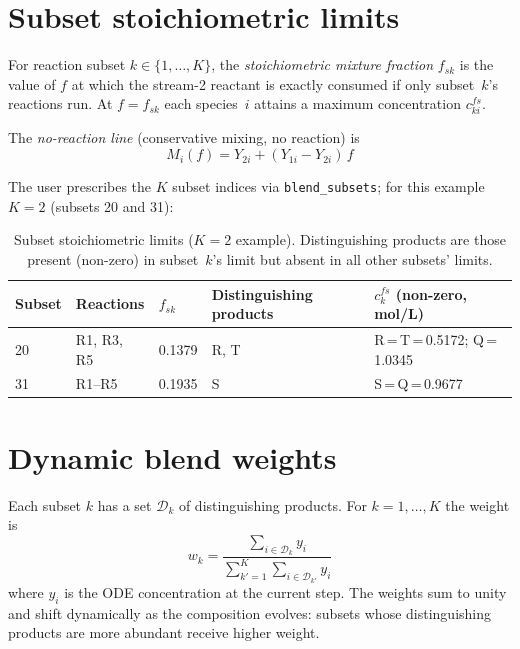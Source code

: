 \documentclass[11pt]{article}
\newcommand{\fsk}{f_{sk}}
\begin{document}
\section{Subset stoichiometric limits}

For reaction subset $k\in\{1,\ldots,K\}$, the \emph{stoichiometric mixture fraction}
$\fsk$ is the value of $f$ at which the stream-2 reactant is exactly consumed if only
subset~$k$'s reactions run.  At $f = \fsk$ each species~$i$ attains a maximum
concentration $c^{fs}_{ki}$.

The \emph{no-reaction line} (conservative mixing, no reaction) is
\begin{equation}
  M_i(f) = Y_{2i} + (Y_{1i} - Y_{2i})\,f
  \label{eq:no-reaction}
\end{equation}

The user prescribes the $K$ subset indices via \texttt{blend\_subsets}; for this example
$K=2$ (subsets 20 and 31):

\begin{table}[h]
\centering
\small
\begin{tabular}{lllll}
\toprule
Subset & Reactions & $\fsk$ & Distinguishing products
       & $c^{fs}_k$ (non-zero, mol/L) \\
\midrule
20 & R1, R3, R5 & 0.1379 & R, T & R\,=\,T\,=\,0.5172;\; Q\,=\,1.0345 \\
31 & R1--R5     & 0.1935 & S    & S\,=\,Q\,=\,0.9677 \\
\bottomrule
\end{tabular}
\caption{Subset stoichiometric limits ($K=2$ example).  Distinguishing products are those
present (non-zero) in subset~$k$'s limit but absent in all other subsets' limits.}
\end{table}

\section{Dynamic blend weights}

Each subset $k$ has a set $\mathcal{D}_k$ of distinguishing products.  For
$k=1,\ldots,K$ the weight is
\begin{equation}
  w_k = \frac{\displaystyle\sum_{i\in\mathcal{D}_k} y_i}
             {\displaystyle\sum_{k'=1}^{K}\sum_{i\in\mathcal{D}_{k'}} y_i}
  \label{eq:weights}
\end{equation}
where $y_i$ is the ODE concentration at the current step.  The weights sum to unity and
shift dynamically as the composition evolves: subsets whose distinguishing products are
more abundant receive higher weight.
\end{document}
